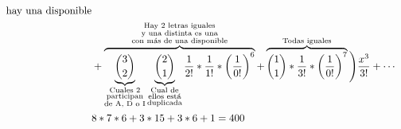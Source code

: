 \documentclass[../main.tex]{subfiles}
\begin{document}
\begin{align*}
{{				\text{hay una disponible}
			}
		}\\
		&+
		\overbrace
		{
			\underbrace
			{
				\binom{3}{2}
			}_
			{
				\substack
				{
					\text{Cuales $2$}\\
					\text{participan}\\
					\text{de A, D o I}
				}
			}
			\underbrace
			{
				\binom{2}{1}
			}_
			{
				\substack
				{
					\text{Cual de}\\
					\text{ellos está}\\
					\text{duplicada}
				}
			}
			\frac{1}{2!}
			* \frac{1}{1!}
			* \left(
				\frac{1}{0!}
			\right)^6
		}^
		{
			\substack
			{
				\text{Hay $2$ letras iguales}\\
				\text{y una distinta es una}\\
				\text{con más de una disponible}
			}
		}
		+
		\overbrace
		{
			\binom{1}{1}
			* \frac{1}{3!}
			* \left(
				\frac{1}{0!}
			\right)^7
		}^
		{
			\substack
			{
				\text{Todas iguales}
			}
		}
	\Bigg{)}
	\frac{x^3}{3!} + \cdots\\
	& 8*7*6+3*15+3*6+1 = 400
\end{align*}
\end{document}
